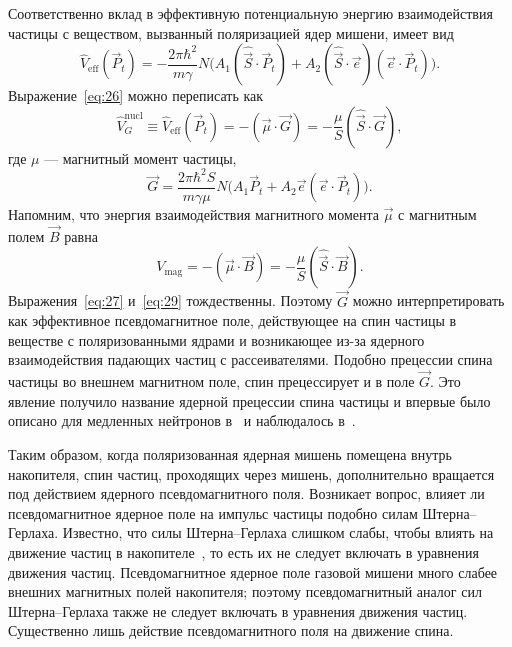 \documentclass[11pt,a4paper]{article}
\newcommand{\hvec}[1]{\hat{\vec{#1}}}
\begin{document}
Соответственно вклад в эффективную потенциальную энергию взаимодействия
частицы с веществом, вызванный поляризацией ядер мишени, имеет вид
\begin{equation}
\hat{V}_{\mathrm{eff}}(\vec{P}_t)
=-\frac{2\pi\hbar^2}{m\gamma}N\bigl(
A_1(\hvec{S}\cdot\vec{P}_t)+A_2(\hvec{S}\cdot\vec{e})(\vec{e}\cdot\vec{P}_t)
\bigr).
\label{eq:26}
\end{equation}
Выражение~\eqref{eq:26} можно переписать как
\begin{equation}
\hat{V}_G^{\mathrm{nucl}}
\equiv\hat{V}_{\mathrm{eff}}(\vec{P}_t)
=-(\vec{\mu}\cdot\vec{G})
=-\frac{\mu}{S}(\hvec{S}\cdot\vec{G}),
\label{eq:27}
\end{equation}
где $\mu$ --- магнитный момент частицы,
\begin{equation}
\vec{G}=\frac{2\pi\hbar^2 S}{m\gamma\mu}N\bigl(
A_1\vec{P}_t+A_2\vec{e}(\vec{e}\cdot\vec{P}_t)
\bigr).
\label{eq:28}
\end{equation}
Напомним, что энергия взаимодействия магнитного момента $\vec{\mu}$
с магнитным полем $\vec{B}$ равна
\begin{equation}
V_{\mathrm{mag}}=-(\vec{\mu}\cdot\vec{B})=-\frac{\mu}{S}(\hvec{S}\cdot\vec{B}).
\label{eq:29}
\end{equation}
Выражения~\eqref{eq:27} и~\eqref{eq:29} тождественны. Поэтому $\vec{G}$
можно интерпретировать как эффективное псевдомагнитное поле, действующее
на спин частицы в веществе с поляризованными ядрами и возникающее из-за
ядерного взаимодействия падающих частиц с рассеивателями. Подобно
прецессии спина частицы во внешнем магнитном поле, спин прецессирует
и в поле $\vec{G}$. Это явление получило название ядерной прецессии
спина частицы и впервые было описано для медленных нейтронов
в~\cite{BaryPod64} и наблюдалось в~\cite{Abragam72,Forte73,Abragam82}.

Таким образом, когда поляризованная ядерная мишень помещена внутрь
накопителя, спин частиц, проходящих через мишень, дополнительно вращается
под действием ядерного псевдомагнитного поля. Возникает вопрос, влияет ли
псевдомагнитное ядерное поле на импульс частицы подобно силам
Штерна--Герлаха. Известно, что силы Штерна--Герлаха слишком слабы,
чтобы влиять на движение частиц в накопителе~\cite{Jackson76,Derbenev73,Hoffstaetter06,Hoffstaetter00,Heinemann01},
то есть их не следует включать в уравнения движения частиц.
Псевдомагнитное ядерное поле газовой мишени много слабее внешних
магнитных полей накопителя; поэтому псевдомагнитный аналог сил
Штерна--Герлаха также не следует включать в уравнения движения частиц.
Существенно лишь действие псевдомагнитного поля на движение спина.
\end{document}
